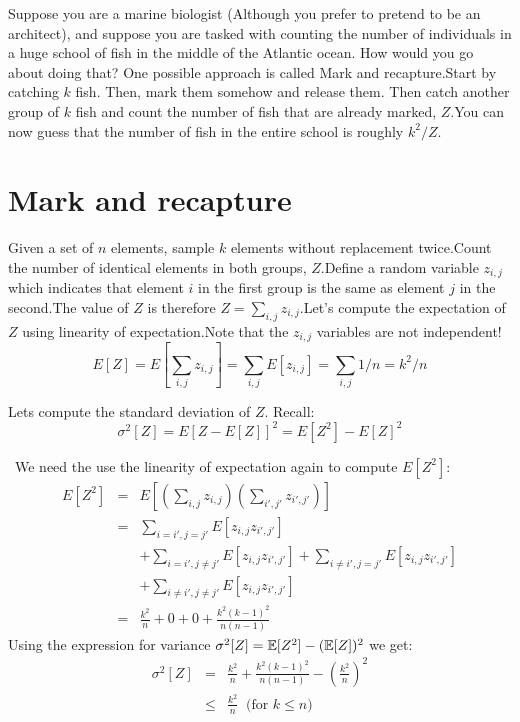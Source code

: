 
 

Suppose you are a marine biologist (Although you prefer to pretend to be an architect), and suppose you are tasked with counting the number of individuals in a huge school of fish in the middle of the Atlantic ocean. How would you go about doing that? One possible approach is called Mark and recapture.Start by catching $k$ fish. Then, mark them somehow and release them. Then catch another group of $k$ fish and count the number of fish that are already marked, $Z$.You can now guess that the number of fish in the entire school is roughly $k^2/Z$.

\section*{Mark and recapture}Given a set of $n$ elements, sample $k$ elements without replacement twice.Count the number of identical elements in both groups, $Z$.Define a random variable $z_{i,j}$ which indicates that element $i$ in the first group is the same as element $j$ in the second.The value of $Z$ is therefore $Z = \sum_{i,j} z_{i,j}$.Let's compute the expectation of $Z$ using linearity of expectation.Note that the $z_{i,j}$ variables are not independent!\begin{equation}E[Z] = E[\sum_{i,j} z_{i,j}] = \sum_{i,j} E [z_{i,j}] = \sum_{i,j} 1/n = k^2/n\end{equation}

\noindent Lets compute the standard deviation of $Z$. Recall:$$\sigma^2[Z]  = E[Z-E[Z]]^2= E[Z^2] - E[Z]^2$$

\noindent  We need the use the linearity of expectation again to compute $E[Z^2]$:\begin{eqnarray}E[Z^2] &=& E[(\sum_{i,j} z_{i,j})(\sum_{i',j'} z_{i',j'})] \\ &=& \sum_{i=i',j=j'} E[z_{i,j}z_{i',j'}] \\& & + \sum_{i=i', j \ne j'} E[z_{i,j}z_{i',j'}] +\sum_{i \ne i', j = j'} E[z_{i,j}z_{i',j'}]  \\& & + \sum_{i \ne i', j \ne j'} E[z_{i,j}z_{i',j'}] \\& = & \frac{k^2}{n} + 0 + 0 + \frac{k^2(k-1)^2}{n(n-1)} \end{eqnarray}Using the expression for variance $\sigma^2[Z] = {\mathbb E}[Z^2] - ({\mathbb E}[Z])^2$ we get:\begin{eqnarray}\sigma^2[Z] &=& \frac{k^2}{n} + \frac{k^2(k-1)^2}{n(n-1)} - \left(\frac{k^2}{n}\right)^2 \\&\le& \frac{k^2}{n}   \;\;\mbox{(for $k \le n$)}\end{eqnarray}


